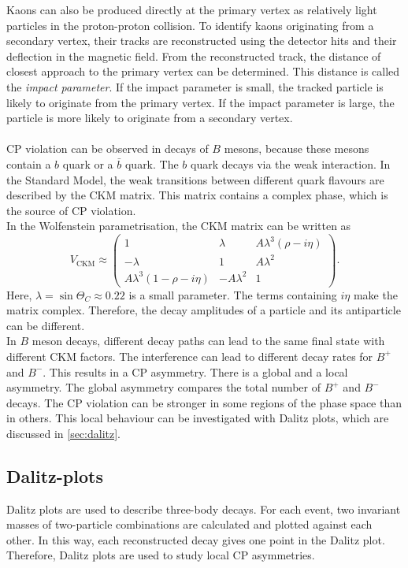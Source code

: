 Kaons can also be produced directly at the primary vertex as relatively light particles in the proton-proton collision. To identify kaons originating from a secondary vertex, their tracks are reconstructed using the detector hits and their deflection in the magnetic field. From the reconstructed track, the distance of closest approach to the primary vertex can be determined. This distance is called the \textit{impact parameter}. If the impact parameter is small, the tracked particle is likely to originate from the primary vertex. If the impact parameter is large, the particle is more likely to originate from a secondary vertex.\\\\
CP violation can be observed in decays of $B$ mesons, because these mesons contain a $b$ quark or a $\bar b$ quark. The $b$ quark decays via the weak interaction. In the Standard Model, the weak transitions between different quark flavours are described by the CKM matrix. This matrix contains a complex phase, which is the source of CP violation.\\
In the Wolfenstein parametrisation, the CKM matrix can be written as
\begin{equation*}
V_{\mathrm{CKM}} \approx
\begin{pmatrix}
1 & \lambda & A\lambda^3(\rho - i\eta) \\
-\lambda & 1 & A\lambda^2 \\
A\lambda^3(1-\rho-i\eta) & -A\lambda^2 & 1
\end{pmatrix}.
\end{equation*}
Here, $\lambda = \sin{\Theta_C} \approx 0.22$ is a small parameter. The terms containing $i\eta$ make the matrix complex. Therefore, the decay amplitudes of a particle and its antiparticle can be different.\\
In $B$ meson decays, different decay paths can lead to the same final state with different CKM factors. The interference can lead to different decay rates for $B^+$ and $B^-$. This results in a CP asymmetry. There is a global and a local asymmetry. The global asymmetry compares the total number of $B^+$ and $B^-$ decays. The CP violation can be stronger in some regions of the phase space than in others. This local behaviour can be investigated with Dalitz plots, which are discussed in \autoref{sec:dalitz}.
\subsection{Dalitz-plots}
\label{sec:dalitz}
Dalitz plots are used to describe three-body decays. For each event, two invariant masses of two-particle combinations are calculated and plotted against each other. In this way, each reconstructed decay gives one point in the Dalitz plot. Therefore, Dalitz plots are used to study local CP asymmetries.

